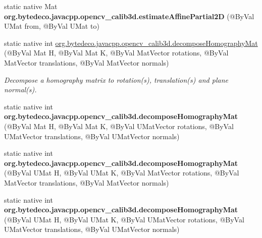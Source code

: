 \begin{DoxyCompactItemize}
\item 
\mbox{\label{group__calib3d_gaa2232d47eb92ff3bc8d9a7bad61fee1c}} 
static native Mat {\bfseries org.\+bytedeco.\+javacpp.\+opencv\+\_\+calib3d.\+estimate\+Affine\+Partial2D} (@By\+Val U\+Mat from, @By\+Val U\+Mat to)
\item 
static native int \hyperlink{group__calib3d_gac6a35d2f8ad957af40b439f4b0a6aad6}{org.\+bytedeco.\+javacpp.\+opencv\+\_\+calib3d.\+decompose\+Homography\+Mat} (@By\+Val Mat H, @By\+Val Mat K, @By\+Val Mat\+Vector rotations, @By\+Val Mat\+Vector translations, @By\+Val Mat\+Vector normals)
\begin{DoxyCompactList}\small\item\em Decompose a homography matrix to rotation(s), translation(s) and plane normal(s). \end{DoxyCompactList}\item 
\mbox{\label{group__calib3d_ga1aeaac250b90e6c79141a7493060c194}} 
static native int {\bfseries org.\+bytedeco.\+javacpp.\+opencv\+\_\+calib3d.\+decompose\+Homography\+Mat} (@By\+Val Mat H, @By\+Val Mat K, @By\+Val U\+Mat\+Vector rotations, @By\+Val U\+Mat\+Vector translations, @By\+Val U\+Mat\+Vector normals)
\item 
\mbox{\label{group__calib3d_ga2de792b5b987d80be90d28c7cc9ade61}} 
static native int {\bfseries org.\+bytedeco.\+javacpp.\+opencv\+\_\+calib3d.\+decompose\+Homography\+Mat} (@By\+Val U\+Mat H, @By\+Val U\+Mat K, @By\+Val Mat\+Vector rotations, @By\+Val Mat\+Vector translations, @By\+Val Mat\+Vector normals)
\item 
\mbox{\label{group__calib3d_gab1e047400f367443248333580bb05063}} 
static native int {\bfseries org.\+bytedeco.\+javacpp.\+opencv\+\_\+calib3d.\+decompose\+Homography\+Mat} (@By\+Val U\+Mat H, @By\+Val U\+Mat K, @By\+Val U\+Mat\+Vector rotations, @By\+Val U\+Mat\+Vector translations, @By\+Val U\+Mat\+Vector normals)
\end{DoxyCompactItemize}
